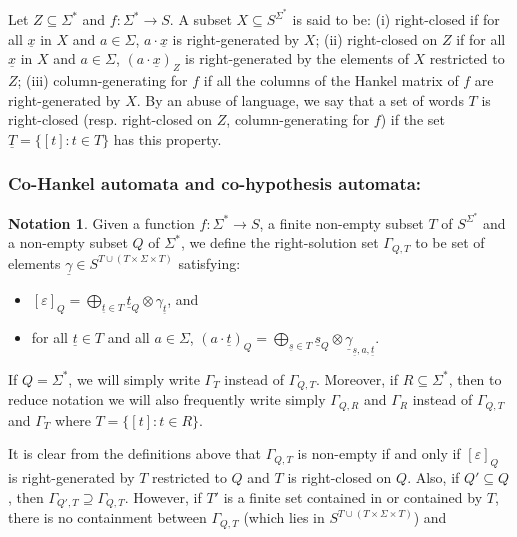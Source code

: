 \documentclass[10pt,a4paper]{amsart}
\theoremstyle{definition}
\numberwithin{equation}{section}
\newtheorem{nota}[thm]{Notation}
\numberwithin{theorem}{section}
\begin{document}
Let  $Z \subseteq \Sigma^*$ and $f: \Sigma^* \rightarrow S$. A subset $X \subseteq S^{\Sigma^*}$ is said to be: (i) right-closed if for all $\underline{x}$ in $X$ and $a \in \Sigma$, $a \cdot \underline{x}$ is right-generated by $X$; (ii) right-closed on $Z$ if for all $\underline{x}$ in $X$ and $a \in \Sigma$, $(a\cdot\underline{x})_Z$ is right-generated by the elements of $X$ restricted to $Z$; (iii) column-generating for $f$ if all the columns of the Hankel matrix of $f$ are right-generated by $X$. By an abuse of language, we say that a set of words $T$ is right-closed (resp. right-closed on $Z$, column-generating for $f$) if the set $\underline{T}=\{ [t]: t \in T\}$ has this property.

\subsubsection*{\textbf{Co-Hankel automata and  co-hypothesis automata:}} 
\begin{nota}
\label{nota:gamma}
Given a function $f: \Sigma^* \rightarrow S$, a finite non-empty subset $T$ of $S^{\Sigma^*}$ and a non-empty subset $Q$ of $\Sigma^*$, we define the right-solution set $\Gamma_{Q, T}$ to be set of elements $\underline{\gamma}
\in S^{T \cup (T \times \Sigma \times T)}$ satisfying:
\begin{itemize}
\item $[ \varepsilon ]_Q = \bigoplus_{\underline{t} \in T}  \underline{t}_Q \otimes \gamma_{\underline{t}}$, and
\item for all $\underline{t} \in T$ and all $a \in \Sigma$, $(a \cdot \underline{t})_Q = \bigoplus_{\underline{s} \in T} \underline{s}_Q \otimes \underline{\gamma}_{\underline{s},a,\underline{t}}$.
\end{itemize}\noindent %
If $Q = \Sigma^*$, we will simply write $\Gamma_T$ instead of $\Gamma_{Q, T}$. Moreover, if $R \subseteq \Sigma^*$, then to reduce notation we will also frequently write simply $\Gamma_{Q, R}$ and  $\Gamma_{R}$ instead of $\Gamma_{Q, T}$ and $\Gamma_{T}$   where $T = \{[t] : t \in R\}$.
\end{nota}
It is clear from the definitions above that $\Gamma_{Q,T}$ is non-empty if and only if $[ \varepsilon ]_Q$ is right-generated by $T$ restricted to $Q$ and $T$ is right-closed on $Q$. Also, if $Q'\subseteq Q$, then $\Gamma_{Q', T} \supseteq \Gamma_{Q, T}$. However, if $T'$ is a finite set contained in or contained by $T$, there is no containment between $\Gamma_{Q, T}$ (which lies in $S^{T \cup (T\times \Sigma \times T)}$) and 
\end{document}
